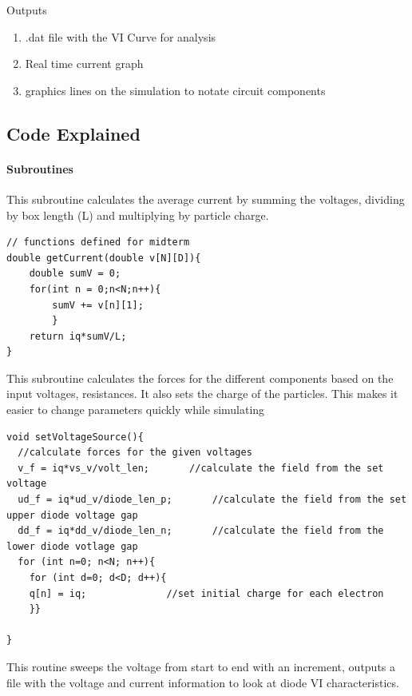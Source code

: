 \documentclass[a4paper]{article}
\begin{document}
Outputs
\begin{enumerate}
\item .dat file with the VI Curve for analysis
\item Real time current graph
\item graphics lines on the simulation to notate circuit components
\end{enumerate}

\subsection{Code Explained}
\paragraph{Subroutines}

This subroutine calculates the average current by summing the voltages, dividing by box length (L) and multiplying by particle charge.

\begin{verbatim}
// functions defined for midterm
double getCurrent(double v[N][D]){
	double sumV = 0;
	for(int n = 0;n<N;n++){
		sumV += v[n][1];
		}
	return iq*sumV/L;
}
\end{verbatim}

This subroutine calculates the forces for the different components based on the input voltages, resistances. It also sets the charge of the particles. This makes it easier to change parameters quickly while simulating

\begin{verbatim}
void setVoltageSource(){
  //calculate forces for the given voltages
  v_f = iq*vs_v/volt_len;		//calculate the field from the set voltage
  ud_f = iq*ud_v/diode_len_p;		//calculate the field from the set upper diode voltage gap
  dd_f = iq*dd_v/diode_len_n;		//calculate the field from the lower diode votlage gap
  for (int n=0; n<N; n++){
    for (int d=0; d<D; d++){
    q[n] = iq;				//set initial charge for each electron
    }}

}
\end{verbatim}

This routine sweeps the voltage from start to end with an increment, outputs a file with the voltage and current information to look at diode VI characteristics.
\end{document}
